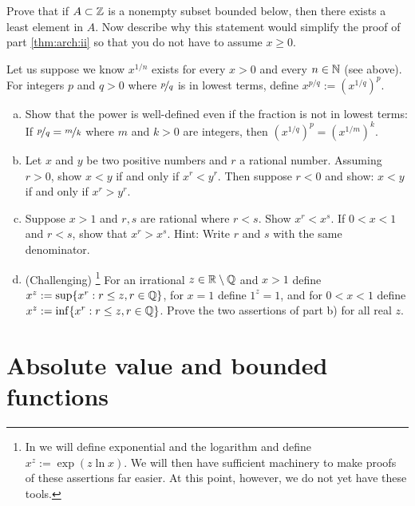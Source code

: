 \begin{exercise}
Prove that if $A \subset {\mathbb{Z}}$ is a nonempty subset bounded below, then
there exists a least element in $A$.  
Now describe why this statement would simplify the proof of
 part \ref{thm:arch:ii} so that you do not have to assume
$x \geq 0$.
\end{exercise}

\begin{samepage}
\begin{exercise} \label{exercise:realpower}
Let us suppose we know $x^{1/n}$ exists for every $x > 0$ and every $n \in
{\mathbb{N}}$ (see  above).
For integers $p$ and $q > 0$ where $\nicefrac{p}{q}$ is in lowest terms, define $x^{p/q} :=
{(x^{1/q})}^p$.
\begin{enumerate}[a)]
\item
Show that the power is well-defined even
if the fraction is not in lowest terms: If $\nicefrac{p}{q} =
\nicefrac{m}{k}$ where $m$ and $k > 0$ are integers, then 
${(x^{1/q})}^p = {(x^{1/m})}^k$.
\item
Let $x$ and $y$ be two positive numbers and $r$ a rational number.
Assuming $r > 0$, show
$x < y$ if and only if $x^r < y^r$.  Then suppose $r < 0$ and show:
$x < y$ if and only if $x^r > y^r$.
\item 
Suppose $x > 1$ and $r,s$ are rational where $r < s$.
Show $x^r < x^s$.  If $0 < x < 1$ and $r < s$, show that $x^r > x^s$.
Hint: Write $r$ and $s$ with the same denominator.
\item
(Challenging)%
\footnote{In
we will define exponential and the logarithm and
define $x^z := \exp(z \ln x)$.  We will then have 
sufficient machinery to make proofs of these assertions far easier.  At this
point, however, we do not yet have these tools.}
For an irrational $z \in {\mathbb{R}} \setminus {\mathbb{Q}}$ and $x > 1$ define
$x^z := \sup \{ x^r : r \leq z, r \in {\mathbb{Q}} \}$,
for $x=1$ define $1^z = 1$,
and for $0 < x < 1$ define
$x^z := \inf \{ x^r : r \leq z, r \in {\mathbb{Q}} \}$.
Prove the two assertions of part b) for all real $z$.
\end{enumerate}
\end{exercise}
\end{samepage}




\sectionnewpage
\section{Absolute value and bounded functions} \label{sec:absval}

